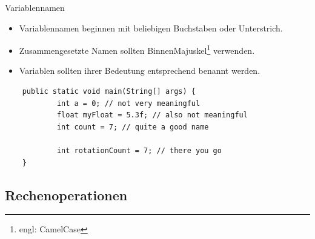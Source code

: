 \begin{frame}[fragile]{Variablennamen}
	\begin{itemize}
		\item Variablennamen beginnen mit beliebigen Buchstaben oder Unterstrich.
		\item Zusammengesetzte Namen sollten BinnenMajuskel\footnote{engl: CamelCase} verwenden.
		\item Variablen sollten ihrer Bedeutung entsprechend benannt werden.
	\end{itemize}
	\begin{lstlisting}
	public static void main(String[] args) {
	    	int a = 0; // not very meaningful
	    	float myFloat = 5.3f; // also not meaningful
	    	int count = 7; // quite a good name
	    	
	    	int rotationCount = 7; // there you go
	}
	\end{lstlisting}
\end{frame}

\subsection{Rechenoperationen}

